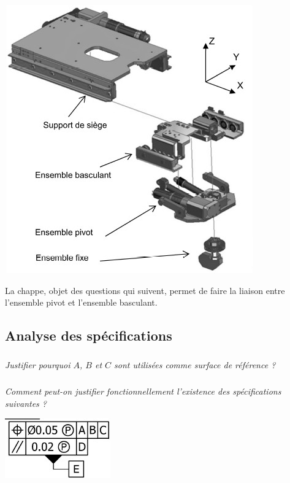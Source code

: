 \documentclass[10pt,fleqn]{article} %
\begin{document}
\begin{multicols}{2}
\begin{center}
\includegraphics[width=\linewidth]{images/fig_04}
\end{center}

La chappe, objet des questions qui suivent, permet de faire la liaison entre l'ensemble pivot et l'ensemble basculant. 

\subsection*{Analyse des spécifications}
\subparagraph{}\textit{Justifier pourquoi $A$, $B$ et $C$ sont utilisées comme surface de référence ?}

\subparagraph{}\textit{Comment peut-on justifier fonctionnellement l'existence des spécifications suivantes ?}

\begin{center}
\includegraphics[width=.5\linewidth]{images/gps_00}
\end{center}



\end{multicols}
\end{document}
